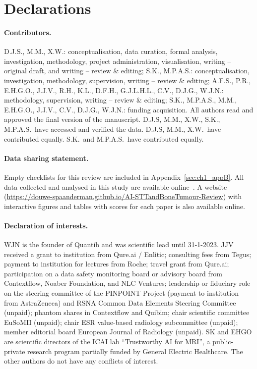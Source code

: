 \section*{Declarations}
\paragraph{Contributors.}
D.J.S., M.M., X.W.: conceptualisation, data curation, formal analysis, investigation, methodology, project administration, visualisation, writing -- original draft, and writing -- review \& editing; S.K., M.P.A.S.: conceptualisation, investigation, methodology, supervision, writing -- review \& editing; A.F.S., P.R., E.H.G.O., J.J.V., R.H., K.L., D.F.H., G.J.L.H.L., C.V., D.J.G., W.J.N.: methodology, supervision, writing -- review \& editing; S.K., M.P.A.S., M.M., E.H.G.O., J.J.V., C.V., D.J.G., W.J.N.: funding acquisition.
All authors read and approved the final version of the manuscript.
D.J.S, M.M., X.W., S.K., M.P.A.S.\ have accessed and verified the data.
D.J.S, M.M., X.W.\ have contributed equally.
S.K.\ and M.P.A.S.\ have contributed equally.

\paragraph{Data sharing statement.}
Empty checklists for this review are included in Appendix~\ref{sec:ch1_appB}.
All data collected and analysed in this study are available online~\autocite{spaanderman2024zenodo}.
A website (\url{https://douwe-spaanderman.github.io/AI-STTandBoneTumour-Review}) with interactive figures and tables with scores for each paper is also available online.

\paragraph{Declaration of interests.}
WJN is the founder of Quantib and was scientific lead until 31-1-2023.
JJV received a grant to institution from Qure.ai / Enlitic; consulting fees from Tegus; payment to institution for lectures from Roche; travel grant from Qure.ai; participation on a data safety monitoring board or advisory board from Contextflow, Noaber Foundation, and NLC Ventures; leadership or fiduciary role on the steering committee of the PINPOINT Project (payment to institution from AstraZeneca) and RSNA Common Data Elements Steering Committee (unpaid); phantom shares in Contextflow and Quibim; chair scientific committee EuSoMII (unpaid); chair ESR value-based radiology subcommittee (unpaid); member editorial board European Journal of Radiology (unpaid).
SK and EHGO are scientific directors of the ICAI lab ``Trustworthy AI for MRI'', a public-private research program partially funded by General Electric Healthcare.
The other authors do not have any conflicts of interest.

